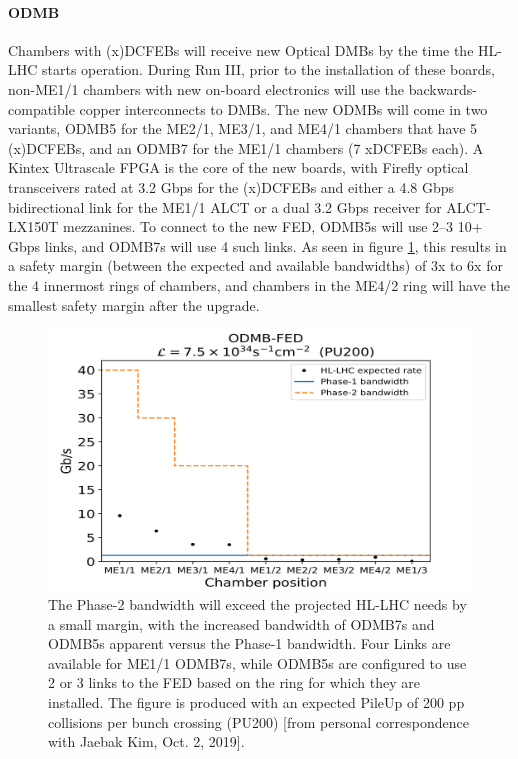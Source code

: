 \documentclass[a4paper,11pt]{article}
\begin{document}
\paragraph{ODMB}
Chambers with (x)DCFEBs will receive new Optical DMBs by the time the HL-LHC starts operation. During Run III, prior to the installation of these boards, non-ME1/1 chambers with new on-board electronics will use the backwards-compatible copper interconnects to DMBs. The new ODMBs will come in two variants, ODMB5 for the ME2/1, ME3/1, and ME4/1 chambers that have 5 (x)DCFEBs, and an ODMB7 for the ME1/1 chambers (7 xDCFEBs each). A Kintex Ultrascale FPGA is the core of the new boards, with Firefly optical transceivers rated at 3.2 Gbps for the (x)DCFEBs and either a 4.8 Gbps bidirectional link for the ME1/1 ALCT or a dual 3.2 Gbps receiver for ALCT-LX150T mezzanines. To connect to the new FED, ODMB5s will use 2--3 10+ Gbps links, and ODMB7s will use 4 such links. As seen in figure \ref{fig:Bandwidth}, this results in a safety margin (between the expected and available bandwidths) of 3x to 6x for the 4 innermost rings of chambers, and chambers in the ME4/2 ring will have the smallest safety margin after the upgrade.
\begin{figure}[htbp]
\centering %
\includegraphics[width=.85\textwidth]{ODMB-FED-Lin.png}
\caption{\label{fig:Bandwidth} The Phase-2 bandwidth will exceed the projected HL-LHC needs by a small margin, with the increased bandwidth of ODMB7s and ODMB5s apparent versus the Phase-1 bandwidth. Four Links are available for ME1/1 ODMB7s, while ODMB5s are configured to use 2 or 3 links to the FED based on the ring for which they are installed. The figure is produced with an expected PileUp of 200 pp collisions per bunch crossing (PU200) [from personal correspondence with Jaebak Kim, Oct. 2, 2019].}
\end{figure}
\end{document}
